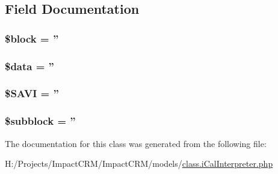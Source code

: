 \subsection{Field Documentation}
\hypertarget{classiCal__Interpreter_a7f8f86b37cd48a37bf0df573d8512d11}{
\subsubsection[{\$block}]{\setlength{\rightskip}{0pt plus 5cm}\$block = ''}}
\label{classiCal__Interpreter_a7f8f86b37cd48a37bf0df573d8512d11}
\hypertarget{classiCal__Interpreter_a6efc15b5a2314dd4b5aaa556a375c6d6}{
\subsubsection[{\$data}]{\setlength{\rightskip}{0pt plus 5cm}\$data = ''}}
\label{classiCal__Interpreter_a6efc15b5a2314dd4b5aaa556a375c6d6}
\hypertarget{classiCal__Interpreter_a6b1385559f5a7063aaf24688452c5d55}{
\subsubsection[{\$SAVI}]{\setlength{\rightskip}{0pt plus 5cm}\$SAVI = ''}}
\label{classiCal__Interpreter_a6b1385559f5a7063aaf24688452c5d55}
\hypertarget{classiCal__Interpreter_a2d499c39518df37e2759becba8383526}{
\subsubsection[{\$subblock}]{\setlength{\rightskip}{0pt plus 5cm}\$subblock = ''}}
\label{classiCal__Interpreter_a2d499c39518df37e2759becba8383526}


The documentation for this class was generated from the following file:\begin{DoxyCompactItemize}
\item 
H:/Projects/ImpactCRM/ImpactCRM/models/\hyperlink{class_8iCalInterpreter_8php}{class.iCalInterpreter.php}\end{DoxyCompactItemize}
